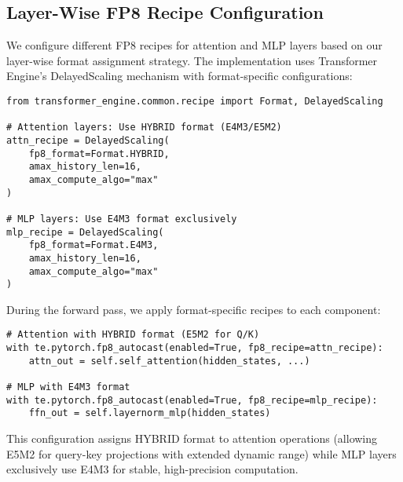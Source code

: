 \subsection{Layer-Wise FP8 Recipe Configuration}

We configure different FP8 recipes for attention and MLP layers based on our layer-wise format assignment strategy. The implementation uses Transformer Engine's DelayedScaling mechanism with format-specific configurations:

\begin{verbatim}
from transformer_engine.common.recipe import Format, DelayedScaling

# Attention layers: Use HYBRID format (E4M3/E5M2)
attn_recipe = DelayedScaling(
    fp8_format=Format.HYBRID,
    amax_history_len=16,
    amax_compute_algo="max"
)

# MLP layers: Use E4M3 format exclusively
mlp_recipe = DelayedScaling(
    fp8_format=Format.E4M3,
    amax_history_len=16,
    amax_compute_algo="max"
)
\end{verbatim}

During the forward pass, we apply format-specific recipes to each component:

\begin{verbatim}
# Attention with HYBRID format (E5M2 for Q/K)
with te.pytorch.fp8_autocast(enabled=True, fp8_recipe=attn_recipe):
    attn_out = self.self_attention(hidden_states, ...)

# MLP with E4M3 format
with te.pytorch.fp8_autocast(enabled=True, fp8_recipe=mlp_recipe):
    ffn_out = self.layernorm_mlp(hidden_states)
\end{verbatim}

This configuration assigns HYBRID format to attention operations (allowing E5M2 for query-key projections with extended dynamic range) while MLP layers exclusively use E4M3 for stable, high-precision computation.

